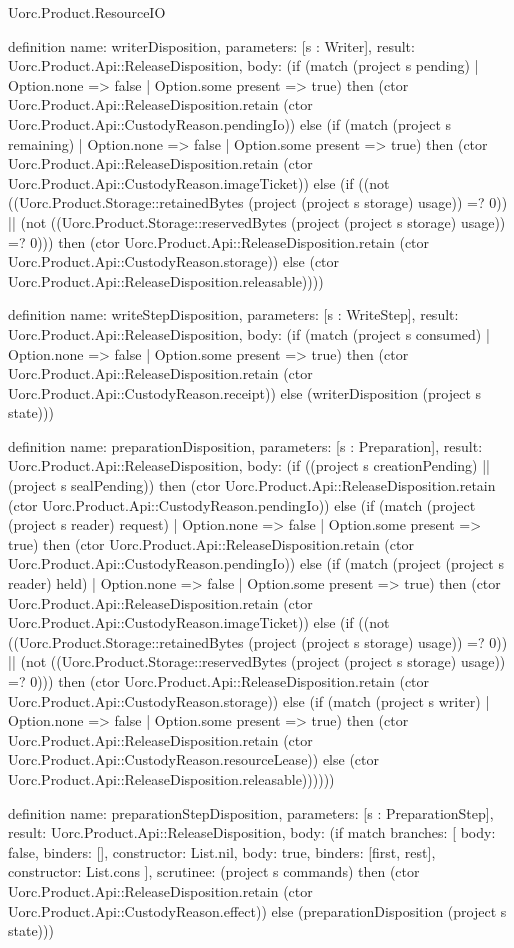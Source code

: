 \begin{lexlean}{Uorc.Product.ResourceIO}
\begin{semanticmodule}
definition{
  name: writerDisposition,
  parameters: [s : Writer],
  result: Uorc.Product.Api::ReleaseDisposition,
  body: (if (match (project s pending)
    | Option.none => false
    | Option.some present => true) then (ctor Uorc.Product.Api::ReleaseDisposition.retain (ctor Uorc.Product.Api::CustodyReason.pendingIo)) else (if (match (project s remaining)
    | Option.none => false
    | Option.some present => true) then (ctor Uorc.Product.Api::ReleaseDisposition.retain (ctor Uorc.Product.Api::CustodyReason.imageTicket)) else (if ((not ((Uorc.Product.Storage::retainedBytes (project (project s storage) usage)) =? 0)) || (not ((Uorc.Product.Storage::reservedBytes (project (project s storage) usage)) =? 0))) then (ctor Uorc.Product.Api::ReleaseDisposition.retain (ctor Uorc.Product.Api::CustodyReason.storage)) else (ctor Uorc.Product.Api::ReleaseDisposition.releasable))))
}

definition{
  name: writeStepDisposition,
  parameters: [s : WriteStep],
  result: Uorc.Product.Api::ReleaseDisposition,
  body: (if (match (project s consumed)
    | Option.none => false
    | Option.some present => true) then (ctor Uorc.Product.Api::ReleaseDisposition.retain (ctor Uorc.Product.Api::CustodyReason.receipt)) else (writerDisposition (project s state)))
}

definition{
  name: preparationDisposition,
  parameters: [s : Preparation],
  result: Uorc.Product.Api::ReleaseDisposition,
  body: (if ((project s creationPending) || (project s sealPending)) then (ctor Uorc.Product.Api::ReleaseDisposition.retain (ctor Uorc.Product.Api::CustodyReason.pendingIo)) else (if (match (project (project s reader) request)
    | Option.none => false
    | Option.some present => true) then (ctor Uorc.Product.Api::ReleaseDisposition.retain (ctor Uorc.Product.Api::CustodyReason.pendingIo)) else (if (match (project (project s reader) held)
    | Option.none => false
    | Option.some present => true) then (ctor Uorc.Product.Api::ReleaseDisposition.retain (ctor Uorc.Product.Api::CustodyReason.imageTicket)) else (if ((not ((Uorc.Product.Storage::retainedBytes (project (project s storage) usage)) =? 0)) || (not ((Uorc.Product.Storage::reservedBytes (project (project s storage) usage)) =? 0))) then (ctor Uorc.Product.Api::ReleaseDisposition.retain (ctor Uorc.Product.Api::CustodyReason.storage)) else (if (match (project s writer)
    | Option.none => false
    | Option.some present => true) then (ctor Uorc.Product.Api::ReleaseDisposition.retain (ctor Uorc.Product.Api::CustodyReason.resourceLease)) else (ctor Uorc.Product.Api::ReleaseDisposition.releasable))))))
}

definition{
  name: preparationStepDisposition,
  parameters: [s : PreparationStep],
  result: Uorc.Product.Api::ReleaseDisposition,
  body: (if match{
    branches: [
      {body: false, binders: [], constructor: List.nil},
      {body: true, binders: [first, rest], constructor: List.cons}
    ],
    scrutinee: (project s commands)
  } then (ctor Uorc.Product.Api::ReleaseDisposition.retain (ctor Uorc.Product.Api::CustodyReason.effect)) else (preparationDisposition (project s state)))
}
\end{semanticmodule}
\end{lexlean}
